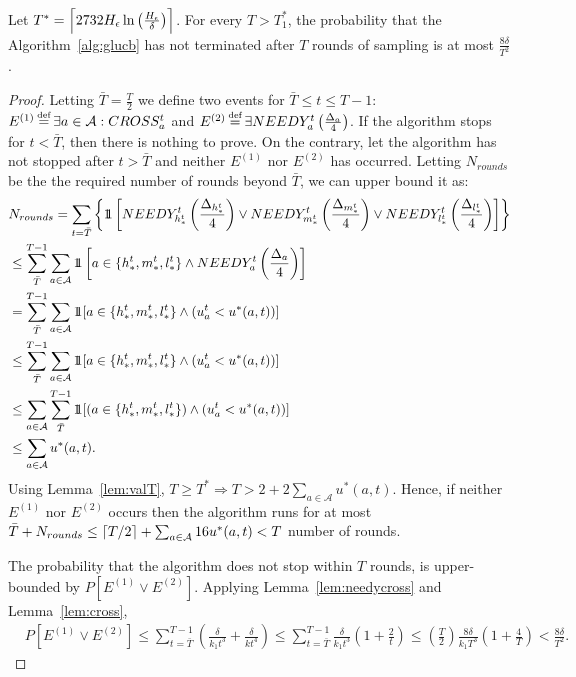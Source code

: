 \begin{lemma}\label{lem:t1star}
 Let $T^* = \bceil{2732H_\epsilon\ln\left(\frac{H_\epsilon}{\delta}\right)}$.
 For every $T > T_1^*$, the probability that the Algorithm~\ref{alg:glucb}
 has not terminated after $T$ rounds of sampling is at most $\frac{8\delta}{T^2}$.
\end{lemma}
\begin{proof}
 Letting $\bar{T} = \frac{T}{2}$ we define two events for $ \bar{T} \leq t \leq T-1$:
   $E^{(1)} \defeq \exists a \in \mathcal{A} : {CROSS_a^t}$ and $E^{(2)} \defeq \exists  NEEDY_{a}^t\left(\frac{\Delta_a}{4}\right)$.
  If the algorithm stops for $t<\bar{T}$, then there is nothing to prove. On the contrary, let the algorithm has not stopped after
  $t > \bar{T}$ and neither $E^{(1)}$ nor $E^{(2)}$ has occurred. 
  Letting $N_{rounds}$ be the the  required number of rounds beyond $\bar{T}$,
  we can upper bound it as:
 \begin{align*}
  &N_{rounds} = \sum\limits_{t=\bar{T}} \left\{\idop\left[NEEDY_{h_*^t}^t\left(\frac{\Delta_{h_*^t}}{4}\right) \vee NEEDY_{m_*^t}^t\left(\frac{\Delta_{m_*^t}}{4}\right)  \vee   NEEDY_{l_*^t}^t\left(\frac{\Delta_{l_*^t}}{4}\right)\right]\right\}\\
  & \leq  \sum_{\bar{T}}^{T-1} \sum_{a \in \mathcal{A}}\idop\left[a \in \{h_*^t, m_*^t,  l_*^t\}\wedge NEEDY_{a}^t\left(\frac{\Delta_a}{4}\right)\right]\\
  & =  \sum_{\bar{T}}^{T-1} \sum_{a \in \mathcal{A}}\idop[a \in \{h_*^t, m_*^t, l_*^t\}\wedge(u_a^t < u^*(a,t))]\\
  & \leq  \sum_{\bar{T}}^{T-1} \sum_{a \in \mathcal{A}}\idop[a \in \{h_*^t, m_*^t, l_*^t\} \wedge(u_a^t < u^*(a,t))]\\
  & \leq  \sum_{a \in \mathcal{A}} \sum_{\bar{T}}^{T-1}\idop[(a \in \{h_*^t, m_*^t, l_*^t\})\wedge(u_a^t < u^*(a,t))]\\
  & \leq  \sum_{a \in \mathcal{A}}u^*(a,t).
 \end{align*}
  Using Lemma~\ref{lem:valT}, $T \geq T^* \Rightarrow T > 2 + 2\sum_{a \in \mathcal{A}}u^*(a,t)$.
 Hence, if neither $E^{(1)}$ nor $E^{(2)}$ occurs then the
 algorithm runs for at most $\bar{T} + N_{rounds} \leq \lceil T/2\rceil + \sum_{a \in \mathcal{A}}16u^*(a,t) < T$ 
 number of rounds.
  

 The probability that the algorithm does not stop within $T$ rounds, is upper-bounded
 by $P[E^{(1)} \vee E^{(2)}]$. Applying Lemma~\ref{lem:needycross} and Lemma~\ref{lem:cross},
 \begin{align*}
  & P[E^{(1)} \vee E^{(2)}] \leq \sum_{t = \bar{T}}^{T-1} \left(\frac{\delta}{k_1 t^3} + \frac{\delta}{kt^4}\right) \leq \sum_{t = \bar{T}}^{T-1} \frac{\delta}{k_1 t^3}\left(1+\frac{2}{t}\right) \leq  \left(\frac{T}{2}\right)\frac{8\delta}{k_1 T^3}\left(1 + \frac{4}{T}\right) < \frac{8\delta}{T^2}. %
 \end{align*}
\end{proof}

